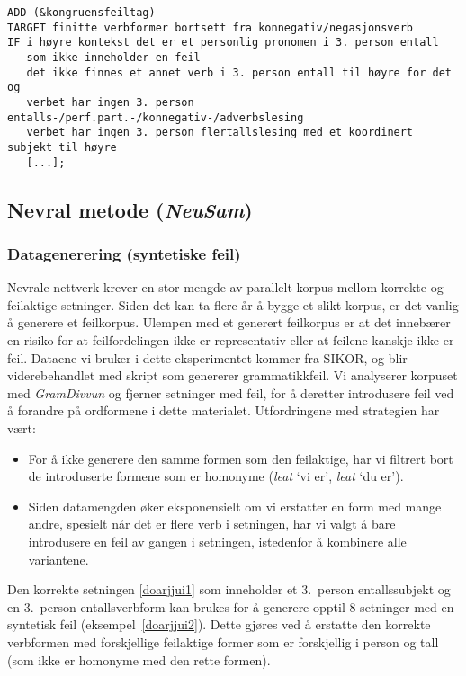 \documentclass{flammie}
\begin{document}
\begin{Verbatim}[frame=single,framerule=0.2mm,framesep=3mm,fontsize=\footnotesize,baselinestretch=1]
ADD (&kongruensfeiltag)
TARGET finitte verbformer bortsett fra konnegativ/negasjonsverb
IF i høyre kontekst det er et personlig pronomen i 3. person entall
   som ikke inneholder en feil
   det ikke finnes et annet verb i 3. person entall til høyre for det og
   verbet har ingen 3. person entalls-/perf.part.-/konnegativ-/adverbslesing
   verbet har ingen 3. person flertallslesing med et koordinert subjekt til høyre
   [...];
\end{Verbatim}


\subsection{Nevral metode (\textit{NeuSam})}


\subsubsection{Datagenerering (syntetiske feil)}\label{sec:datagenerering}

Nevrale nettverk krever en stor mengde av parallelt korpus mellom korrekte og
feilaktige setninger.  Siden det kan ta flere år å bygge et slikt korpus, er det
vanlig å generere et feilkorpus. Ulempen med et generert feilkorpus er at det
innebærer en risiko for at feilfordelingen ikke er representativ eller at
feilene kanskje ikke er feil.  Dataene vi bruker i dette eksperimentet kommer
fra SIKOR, og blir viderebehandlet med skript som genererer grammatikkfeil.  Vi
analyserer korpuset med \textit{GramDivvun} og fjerner setninger med feil, for å
deretter introdusere feil ved å forandre på ordformene i dette materialet.
Utfordringene med strategien har vært:

\begin{itemize}
  \item For å ikke generere den samme formen som den feilaktige, har vi filtrert bort de introduserte formene som er homonyme (\textit{leat} `vi er', \textit{leat} `du er').
  \item Siden datamengden øker eksponensielt om vi erstatter en form med mange andre, spesielt når det er flere verb i setningen, har vi valgt å bare introdusere en feil av gangen i setningen, istedenfor å kombinere alle variantene.
\end{itemize}

Den korrekte setningen \ref{doarjjui1} som inneholder et 3.\ person
entallssubjekt og en 3.\ person entallsverbform kan brukes for å generere opptil
8 setninger med en syntetisk feil (eksempel~\ref{doarjjui2}). Dette gjøres ved å
erstatte den korrekte verbformen med forskjellige feilaktige former som er
forskjellig i person og tall (som ikke er homonyme med den rette formen).
\end{document}
